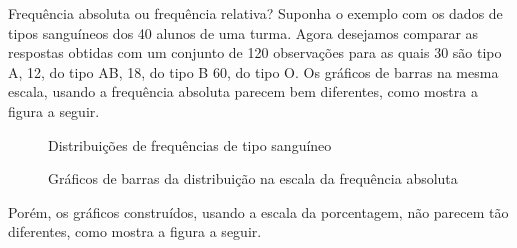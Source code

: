 {\begin{example}{Frequência absoluta ou frequência relativa?}
Suponha o exemplo com os dados de tipos sanguíneos dos 40 alunos de uma turma. Agora desejamos comparar as respostas obtidas com um conjunto de 120 observações para as quais 30 são tipo A, 12, do tipo AB, 18, do tipo B 60, do tipo O. Os gráficos de barras na mesma escala, usando a frequência absoluta parecem bem diferentes, como mostra a figura a seguir.

\begin{figure}[H]
\centering
Distribuições de frequências de tipo sanguíneo
\vspace{2em}

\hspace{1em}

\caption{Gráficos de barras da distribuição na escala da frequência absoluta}
\label{sangue1}
\end{figure}

Porém, os gráficos construídos, usando a escala da porcentagem, não parecem tão diferentes, como mostra a figura a seguir.


\end{example}}
